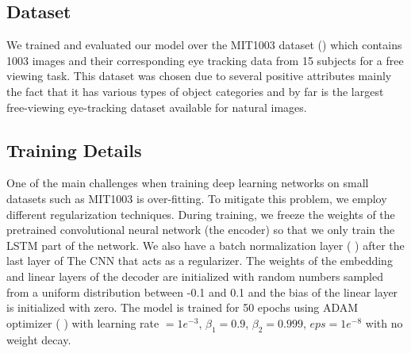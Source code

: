 \documentclass{article} %
\begin{document}
\subsection{Dataset}
We trained and evaluated our model over the MIT1003 dataset (\cite{Judd_2009}) which contains 1003 images and their corresponding eye tracking data from 15 subjects for  a free viewing task. This dataset was chosen due to several positive attributes mainly the fact that it has various types of object categories and by far is the largest free-viewing eye-tracking dataset available for natural images.

\subsection{Training Details}
One of the main challenges when training deep learning networks on small datasets such as MIT1003 is over-fitting. To mitigate this problem, we  employ different regularization techniques. During training, we freeze the weights of the pretrained convolutional neural network (the encoder) so that we only  train the LSTM part of the network. We also have a batch normalization layer (\cite{DBLP:journals/corr/IoffeS15} ) after the last layer of The CNN that acts as a regularizer. The weights of the embedding and linear layers of the decoder are initialized with random numbers sampled from a uniform distribution between -0.1 and 0.1 and the bias of the linear layer is initialized with zero. The model is trained for 50 epochs using ADAM optimizer (\cite{DBLP:journals/corr/KingmaB14} ) with learning rate $=1e^{-3}$, $\beta_1=0.9$,  $\beta_2=0.999$, $eps=1e^{-8}$ with no weight decay.

\end{document}
